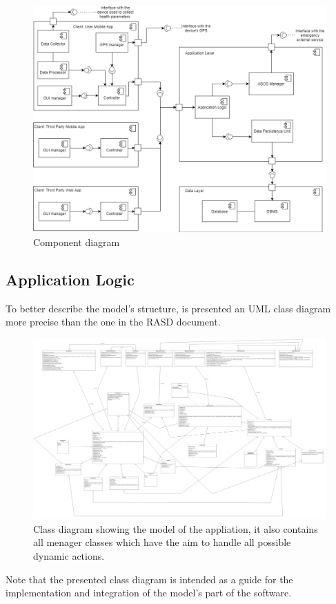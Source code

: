 \begin{figure}[h!]
	\includegraphics[width=1.0\textwidth]{./pictures/component_diagram.png}\par
	\caption{Component diagram}
\end{figure}
\FloatBarrier

\subsection{Application Logic}
To better describe the model's structure, is presented an UML class diagram more precise than the one in the RASD document. \\

\begin{figure}[h!]
	\includegraphics[width=1.0\textwidth]{./pictures/class_diagram.png}\par
	\caption{Class diagram showing the model of the appliation, it also contains all menager classes which have the aim to handle 			all possible dynamic actions.}
\end{figure}
\FloatBarrier
Note that the presented class diagram is intended as a guide for the implementation and integration of the model's part of the software.


